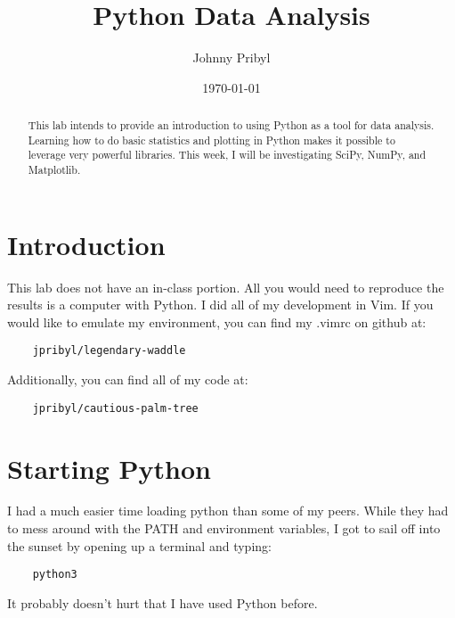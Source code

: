 \documentclass{article}
\date{\today} %
\begin{document}
\title{Python Data Analysis}
\author{Johnny Pribyl}
\maketitle

\begin{abstract}
        This lab intends to provide an introduction to using Python as a tool
        for data analysis. Learning how to do basic statistics and plotting in
        Python makes it possible to leverage very powerful libraries. This week,
        I will be investigating SciPy, NumPy, and Matplotlib.
\end{abstract}



\section{Introduction}

    This lab does not have an in-class portion. All you would need
    to reproduce the results is a computer with Python. I did all of my
    development in Vim. If you would like to emulate my environment, you can
    find my .vimrc on github at:

\begin{verbatim}
    jpribyl/legendary-waddle 
\end{verbatim}
Additionally, you can find all of my code at:
\begin{verbatim}
    jpribyl/cautious-palm-tree
\end{verbatim}

\section{Starting Python}

I had a much easier time loading python than some of my peers.
While they had to mess around with the PATH and environment variables, I got to
sail off into the sunset by opening up a terminal and typing:
\begin{verbatim}
    python3
\end{verbatim}
It probably doesn't hurt that I have used Python before.
\end{document}

